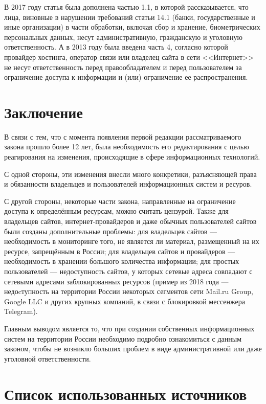 В 2017 году статья была дополнена частью 1.1, в которой рассказывается, что лица, виновные в нарушении требований статьи 14.1 (банки, государственные и иные организации) в части обработки, включая сбор и хранение, биометрических персональных данных, несут административную, гражданскую и уголовную ответственность. А в 2013 году была введена часть 4, согласно которой провайдер хостинга, оператор связи или владелец сайта в сети <<Интернет>> не несут ответственность перед правообладателем и перед пользователем за ограничение доступа к информации и (или) ограничение ее распространения.

\section{Заключение}

В связи с тем, что с момента появления первой редакции рассматриваемого закона прошло более 12 лет, была необходимость его редактирования с целью реагирования на изменения, происходящие в сфере информационных технологий. 

С одной стороны, эти изменения внесли много конкретики, разъясняющей права и обязанности владельцев и пользователей информационных систем и ресуров. 

С другой стороны, некоторые части закона, направленные на ограничение доступа к определённым ресурсам, можно считать цензурой. Также для владельцев сайтов, интернет-провайдеров и даже обычных пользователей сайтов были созданы дополнительные проблемы: для владельцев сайтов --- необходимость в мониторинге того, не является ли материал, размещенный на их ресурсе, запрещённым в России; для владельцев сайтов и провайдеров --- необходимость в хранении большого количества информации; для простых пользователей --- недоступность сайтов, у которых сетевые адреса совпадают с сетевыми адресами заблокированных ресурсов (пример из 2018 года --- недоcтупность на территории России некоторых сегментов сети Mail.ru Group, Google LLC и других крупных компаний, в связи с блокировкой мессенжера Telegram).

Главным выводом является то, что при создании собственных информационных систем на территории России необходимо подробно ознакомиться с данным законом, чтобы не возникло больших проблем в виде административной или даже уголовной ответственности.

\section{Список использованных источников}

